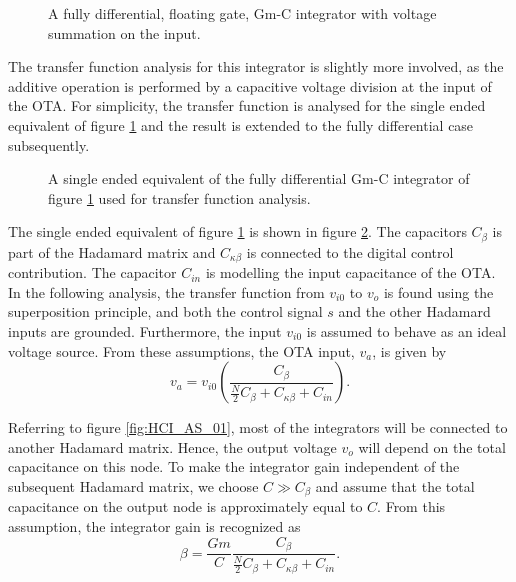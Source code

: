 \begin{figure}[htbp]
    \centering
    
    \caption{A fully differential, floating gate, Gm-C integrator with voltage summation on the input.}
    \label{fig:GmCint}
\end{figure}

The transfer function analysis for this integrator is slightly more involved, as the additive operation is performed by a capacitive voltage division at the input of the OTA. For simplicity, the transfer function is analysed for the single ended equivalent of figure \ref{fig:GmCint} and the result is extended to the fully differential case subsequently.

\begin{figure}[htbp]
    \centering
    
    \caption{A single ended equivalent of the fully differential Gm-C integrator of figure \ref{fig:GmCint} used for transfer function analysis.}
    \label{fig:GmCint_single_ended}
\end{figure}

The single ended equivalent of figure \ref{fig:GmCint} is shown in figure \ref{fig:GmCint_single_ended}. The capacitors $C_\beta$ is part of the Hadamard matrix and $C_{\kappa\beta}$ is connected to the digital control contribution. The capacitor $C_{in}$ is modelling the input capacitance of the OTA. In the following analysis, the transfer function from $v_{i0}$ to $v_o$ is found using the superposition principle, and both the control signal $s$ and the other Hadamard inputs are grounded. Furthermore, the input $v_{i0}$ is assumed to behave as an ideal voltage source. From these assumptions, the OTA input, $v_a$, is given by
\begin{equation}
    v_a = v_{i0} \left( \frac{C_\beta}{\frac{N}{2}C_\beta + C_{\kappa\beta} + C_{in}} \right).
\end{equation}

Referring to figure \ref{fig:HCI_AS_01}, most of the integrators will be connected to another Hadamard matrix. Hence, the output voltage $v_o$ will depend on the total capacitance on this node. To make the integrator gain independent of the subsequent Hadamard matrix, we choose $C \gg C_\beta$ and assume that the total capacitance on the output node is approximately equal to $C$. From this assumption, the integrator gain is recognized as
\begin{equation}
    \label{eq:beta_GmC}
    \beta = \frac{Gm}{C}\frac{C_\beta}{\frac{N}{2}C_\beta + C_{\kappa\beta} + C_{in}}.
\end{equation}









